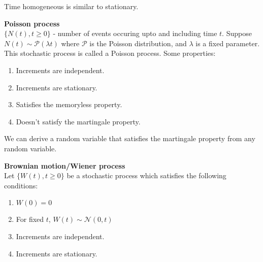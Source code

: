 \documentclass[a4paper]{article}
\newcommand{\nl}{\vspace{0.2cm}\\}
\renewcommand{\sp}{\vspace{0.2cm}}
\renewcommand{\P}{\mathcal{P}}
\newcommand{\N}{\mathcal{N}}
\begin{document}
Time homogeneous is similar to stationary.
\sp
\begin{eg}
    \textbf{Poisson process}\nl
    $\{N(t), t \ge 0\}$ - number of events occuring upto and including time $t$. Suppose $N(t) \sim \P(\lambda t)$ where $\P$ is the Poisson distribution, and $\lambda$ is a fixed
    parameter. This stochastic process is called a Poisson process. Some properties:
    \begin{enumerate}
        \item Increments are independent.
        \item Increments are stationary.
        \item Satisfies the memoryless property.
        \item Doesn't satisfy the martingale property.
    \end{enumerate}
    We can derive a random variable that satisfies the martingale property from any random variable.
\end{eg}
\sp
\begin{eg}
    \textbf{Brownian motion/Wiener process}\nl
    Let $\{W(t), t \ge 0\}$ be a stochastic process which satisfies the following conditions:
    \begin{enumerate}
        \item $W(0) = 0$
        \item For fixed $t$, $W(t) \sim \N(0, t)$
        \item Increments are independent.
        \item Increments are stationary.
    \end{enumerate}
\end{eg}
\end{document}
